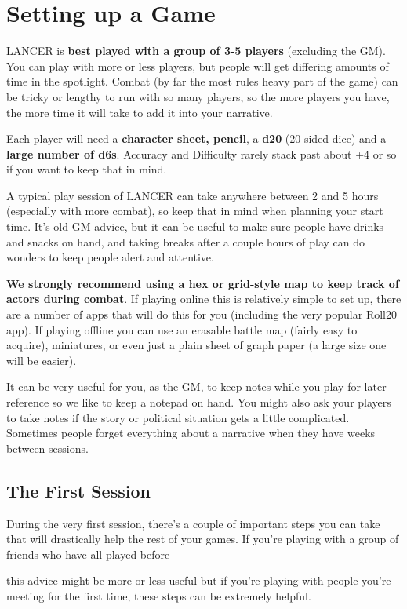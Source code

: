 \section{Setting up a Game}

LANCER is \textbf{best played with a group of 3-5 players} (excluding the GM). You can play with more
or less players, but people will get differing amounts of time in the spotlight. Combat (by far the
most rules heavy part of the game) can be tricky or lengthy to run with so many players, so the
more players you have, the more time it will take to add it into your narrative.

Each player will need a \textbf{character sheet, pencil}, a \textbf{d20} (20 sided dice) and a \textbf{large number of
d6s}. Accuracy and Difficulty rarely stack past about +4 or so if you want to keep that in mind.

A typical play session of LANCER can take anywhere between 2 and 5 hours (especially with
more combat), so keep that in mind when planning your start time. It's old GM advice, but it can
be useful to make sure people have drinks and snacks on hand, and taking breaks after a couple
hours of play can do wonders to keep people alert and attentive.

\textbf{We strongly recommend using a hex or grid-style map to keep track of actors during
combat}. If playing online this is relatively simple to set up, there are a number of apps that will
do this for you (including the very popular Roll20 app). If playing offline you can use an erasable
battle map (fairly easy to acquire), miniatures, or even just a plain sheet of graph paper (a large
size one will be easier).

It can be very useful for you, as the GM, to keep notes while you play for later reference so we
like to keep a notepad on hand. You might also ask your players to take notes if the story or
political situation gets a little complicated. Sometimes people forget everything about a narrative
when they have weeks between sessions.

\subsection{The First Session}

During the very first session, there's a couple of important steps you can take that will drastically
help the rest of your games. If you're playing with a group of friends who have all played before

this advice might be more or less useful but if you're playing with people you're meeting for the
first time, these steps can be extremely helpful.

